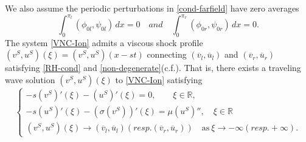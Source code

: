 \documentclass[12pt,reqno]{amsart}
\numberwithin{equation}{section}
\def\R{\mathbb{R}}
\begin{document}
We also assume the periodic perturbations in \eqref{cond-farfield}  have zero averages
\begin{equation}\label{0-A}
	\int_{0}^{\pi_l}(\phi_{0l},\psi_{0l})\,dx=0 \quad and \quad \int_{0}^{\pi_r}(\phi_{0r},\psi_{0r})\,dx=0.
\end{equation}
The system \eqref{VNC-Ion} admits a viscous shock profile $(v^S,u^S)(\xi)=(v^S,u^S)(x-st)$ connecting $(\overline{v}_l,\overline{u}_l)$ and $(\overline{v}_r,\overline{u}_r)$ satisfying \eqref{RH-cond} and \eqref{non-degenerate}(c.f.\cite{InitialModel}). That is, there exists a traveling wave solution $(v^S,u^S)(\xi)$ to \eqref{VNC-Ion} satisfying
\begin{equation}\label{profile}
	\begin{cases}
		-s(v^S)'(\xi)-(u^S)'(\xi)=0,\qquad \xi \in \R,\\
		-s(u^S)'(\xi)-(\sigma(v^S))'(\xi)=\mu (u^S)'',\quad \xi \in \R\\
		(v^S,u^S)(\xi) \to (\overline{v}_l,\overline{u}_l)(resp.(\overline{v}_r,\overline{u}_r)) \quad \text{as}~\xi \to -\infty(resp.+\infty).
	\end{cases}
\end{equation}
\end{document}
